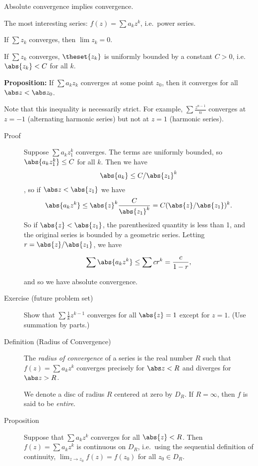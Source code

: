 \begin{description}
\tightlist
\item[Lemma]
Absolute convergence implies convergence.
\end{description}

The most interesting series: \(f(z) = \sum a_k z^k\), i.e.~power series.

\begin{description}
\tightlist
\item[Lemma (Divergence)]
If \(\sum z_k\) converges, then \(\lim z_k = 0\).
\item[Corollary]
If \(\sum z_k\) converges, \(\theset{z_k}\) is uniformly bounded by a
constant \(C > 0\), i.e.~\(\abs{z_k} < C\) for all \(k\).
\end{description}

\textbf{Proposition:} If \(\sum a_k z_k\) converges at some point
\(z_0\), then it converges for all \(\abs z < \abs z_0\).

Note that this inequality is necessarily strict. For example,
\(\sum \frac{z^{n-1}}{n}\) converges at \(z=-1\) (alternating harmonic
series) but not at \(z=1\) (harmonic series).

\begin{description}
\item[Proof]
Suppose \(\sum a_k z_1^k\) converges. The terms are uniformly bounded,
so \(\abs{a_k z_1^k} \leq C\) for all \(k\). Then we have
\begin{align*}\abs {a_k} \leq C/\abs{z_1}^k\end{align*}, so if
\(\abs z < \abs{z_1}\) we have
\begin{align*}\abs{a_k z^k} \leq \abs{z}^k \frac{C}{\abs{z_1}^k} = C (\abs{z} / \abs{z_1} )^k.\end{align*}
So if \(\abs{z} < \abs{z_1}\), the parenthesized quantity is less than
1, and the original series is bounded by a geometric series. Letting
\(r = \abs{z} / \abs{z_1}\), we have

\begin{align*}
\sum \abs{a_k z^k} \leq \sum c r^k = \frac{c}{1-r}
,\end{align*}

and so we have absolute convergence.
\item[Exercise (future problem set)]
Show that \(\sum \frac 1 k z^{k-1}\) converges for all \(\abs{z} = 1\)
except for \(z = 1\). (Use summation by parts.)
\item[Definition (Radius of Convergence)]
The \emph{radius of convergence} of a series is the real number \(R\)
such that \(f(z) = \sum a_k z^k\) converges precisely for \(\abs z < R\)
and diverges for \(\abs z > R\).

We denote a disc of radius \(R\) centered at zero by \(D_R\). If
\(R=\infty\), then \(f\) is said to be \emph{entire}.
\item[Proposition]
Suppose that \(\sum a_k z^k\) converges for all \(\abs{z} < R\). Then
\(f(z) = \sum a_k z^k\) is continuous on \(D_R\), i.e.~using the
sequential definition of continuity, \(\lim_{z\to z_0} f(z) = f(z_0)\)
for all \(z_0 \in D_R\).
\end{description}

